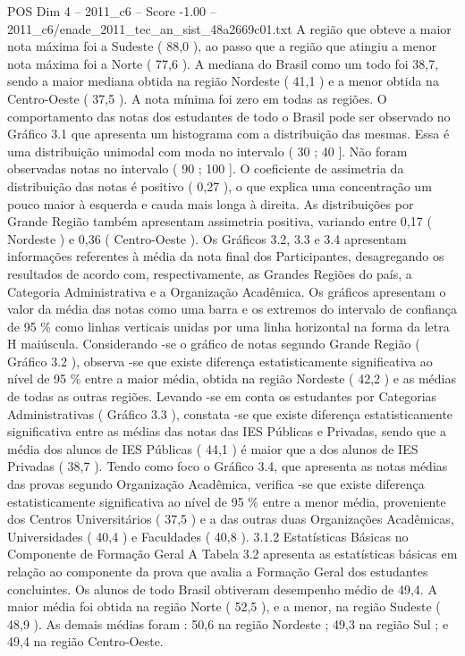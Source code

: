 \begin{textsample}{POS Dim 4 – 2011\_c6 – Score -1.00 – 2011\_c6/enade\_2011\_tec\_an\_sist\_48a2669c01.txt}
A região que obteve a maior nota máxima foi a Sudeste ( 88,0 ), ao passo que a região que atingiu a menor nota máxima foi a Norte ( 77,6 ).
A mediana do Brasil como um todo foi 38,7, sendo a maior mediana obtida na região Nordeste ( 41,1 ) e a menor obtida na Centro-Oeste ( 37,5 ).
A nota mínima foi zero em todas as regiões.
O comportamento das notas dos estudantes de todo o Brasil pode ser observado no Gráfico 3.1 que apresenta um histograma com a distribuição das mesmas.
Essa é uma distribuição unimodal com moda no intervalo ( 30 ; 40 ].
Não foram observadas notas no intervalo ( 90 ; 100 ].
O coeficiente de assimetria da distribuição das notas é positivo ( 0,27 ), o que explica uma concentração um pouco maior à esquerda e cauda mais longa à direita.
As distribuições por Grande Região também apresentam assimetria positiva, variando entre 0,17 ( Nordeste ) e 0,36 ( Centro-Oeste ).
Os Gráficos 3.2, 3.3 e 3.4 apresentam informações referentes à média da nota final dos Participantes, desagregando os resultados de acordo com, respectivamente, as Grandes Regiões do país, a Categoria Administrativa e a Organização Acadêmica.
Os gráficos apresentam o valor da média das notas como uma barra e os extremos do intervalo de confiança de 95 \% como linhas verticais unidas por uma linha horizontal na forma da letra H maiúscula.
Considerando -se o gráfico de notas segundo Grande Região ( Gráfico 3.2 ), observa -se que existe diferença estatisticamente significativa ao nível de 95 \% entre a maior média, obtida na região Nordeste ( 42,2 ) e as médias de todas as outras regiões.
Levando -se em conta os estudantes por Categorias Administrativas ( Gráfico 3.3 ), constata -se que existe diferença estatisticamente significativa entre as médias das notas das IES Públicas e Privadas, sendo que a média dos alunos de IES Públicas ( 44,1 ) é maior que a dos alunos de IES Privadas ( 38,7 ).
Tendo como foco o Gráfico 3.4, que apresenta as notas médias das provas segundo Organização Acadêmica, verifica -se que existe diferença estatisticamente significativa ao nível de 95 \% entre a menor média, proveniente dos Centros Universitários ( 37,5 ) e a das outras duas Organizações Acadêmicas, Universidades ( 40,4 ) e Faculdades ( 40,8 ). 3.1.2 Estatísticas Básicas no Componente de Formação Geral A Tabela 3.2 apresenta as estatísticas básicas em relação ao componente da prova que avalia a Formação Geral dos estudantes concluintes.
Os alunos de todo Brasil obtiveram desempenho médio de 49,4.
A maior média foi obtida na região Norte ( 52,5 ), e a menor, na região Sudeste ( 48,9 ).
As demais médias foram : 50,6 na região Nordeste ; 49,3 na região Sul ; e 49,4 na região Centro-Oeste.

\end{textsample}
